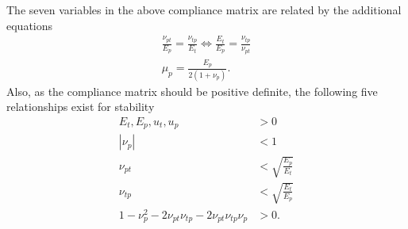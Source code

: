 The seven variables in the above compliance matrix are related by the additional equations
\begin{gather*}
  \frac{\nu_{pt}}{E_p} = \frac{\nu_{tp}}{E_t} \iff \frac{E_t}{E_p} = \frac{\nu_{tp}}{\nu_{pt}} \\
  \mu_p = \frac{E_p}{2 \left( 1 + \nu_p \right)}
.\end{gather*}
Also, as the compliance matrix should be positive definite, the following five relationships exist for stability
\begin{align*}
  E_t, E_p, u_t, u_p &> 0 \\
  \left| \nu_p \right| &< 1 \\
  \nu_{pt} &< \sqrt{\frac{E_p}{E_t}} \\
  \nu_{tp} &< \sqrt{\frac{E_t}{E_p}} \\
  1 - \nu_p^2 - 2\nu_{pt}\nu_{tp} - 2\nu_{pt}\nu_{tp}\nu_p &> 0
.\end{align*}
